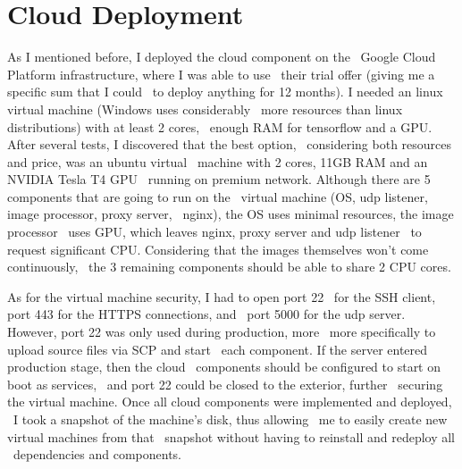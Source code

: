 \section{Cloud Deployment}
\label{sec:implementation-cloud-deployment}
As I mentioned before, I deployed the cloud component on the \
Google Cloud Platform infrastructure, where I was able to use \
their trial offer (giving me a specific sum that I could \
to deploy anything for 12 months).
I needed an linux virtual machine (Windows uses considerably \
more resources than linux distributions) with at least 2 cores, \
enough RAM for tensorflow and a GPU.
After several tests, I discovered that the best option, \
considering both resources and price, was an ubuntu virtual \
machine with 2 cores, 11GB RAM and an NVIDIA Tesla T4 GPU \
running on premium network.
Although there are 5 components that are going to run on the \
virtual machine (OS, udp listener, image processor, proxy server, \
nginx), the OS uses minimal resources, the image processor \
uses GPU, which leaves nginx, proxy server and udp listener \
to request significant CPU.
Considering that the images themselves won't come continuously, \
the 3 remaining components should be able to share 2 CPU cores.

As for the virtual machine security, I had to open port 22 \
for the SSH client, port 443 for the HTTPS connections, and \
port 5000 for the udp server.
However, port 22 was only used during production, more \
more specifically to upload source files via SCP and start \
each component.
If the server entered production stage, then the cloud \
components should be configured to start on boot as services, \
and port 22 could be closed to the exterior, further \
securing the virtual machine.
Once all cloud components were implemented and deployed, \
I took a snapshot of the machine's disk, thus allowing \
me to easily create new virtual machines from that \
snapshot without having to reinstall and redeploy all \
dependencies and components.




%
%
